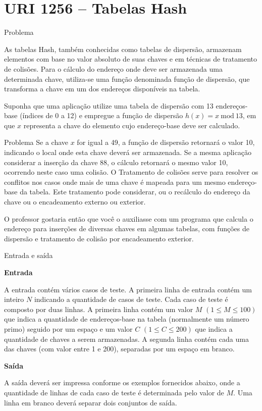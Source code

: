 \section{URI 1256 -- Tabelas Hash}

\begin{frame}[fragile]{Problema}

As tabelas Hash, também conhecidas como tabelas de dispersão, armazenam elementos com base no valor absoluto de suas chaves e em técnicas de tratamento de colisões. Para o cálculo do endereço onde deve ser armazenada uma determinada chave, utiliza-se uma função denominada função de dispersão, que transforma a chave em um dos endereços disponíveis na tabela.

Suponha que uma aplicação utilize uma tabela de dispersão com 13 endereços-base (índices de 0 a 12) e empregue a função de dispersão $h(x) = x\ \mbox{mod}\ 13$, em que $x$ representa a chave do elemento cujo endereço-base deve ser calculado.
\end{frame}

\begin{frame}[fragile]{Problema}
Se a chave $x$ for igual a 49, a função de dispersão retornará o valor 10, indicando o local onde esta chave deverá ser armazenada. Se a mesma aplicação considerar a inserção da chave 88, o cálculo retornará o mesmo valor 10, ocorrendo neste caso uma colisão. O Tratamento de colisões serve para resolver os conflitos nos casos onde mais de uma chave é mapeada para um mesmo endereço-base da tabela. Este tratamento pode considerar, ou o recálculo do endereço da chave ou o encadeamento externo ou exterior.

O professor gostaria então que você o auxiliasse com um programa que calcula o endereço para inserções de diversas chaves em algumas tabelas, com funções de dispersão e tratamento de colisão por encadeamento exterior.

\end{frame}

\begin{frame}[fragile]{Entrada e saída}

\textbf{Entrada}

A entrada contém vários casos de teste. A primeira linha de entrada contém um inteiro $N$ indicando 
a quantidade de casos de teste. Cada caso de teste é composto por duas linhas. A primeira linha 
contém um valor $M$ $(1\leq M\leq 100)$ que indica a quantidade de endereços-base na tabela 
(normalmente um número primo) seguido por um espaço e um valor $C$ $(1\leq C\leq 200)$ que indica a 
quantidade de chaves a serem armazenadas. A segunda linha contém cada uma das chaves (com valor 
entre 1 e 200), separadas por um espaço em branco.

\textbf{Saída}

A saída deverá ser impressa conforme os exemplos fornecidos abaixo, onde a quantidade de linhas de cada caso de teste é determinada pelo valor de $M$. Uma linha em branco deverá separar dois conjuntos de saída.

\end{frame}

